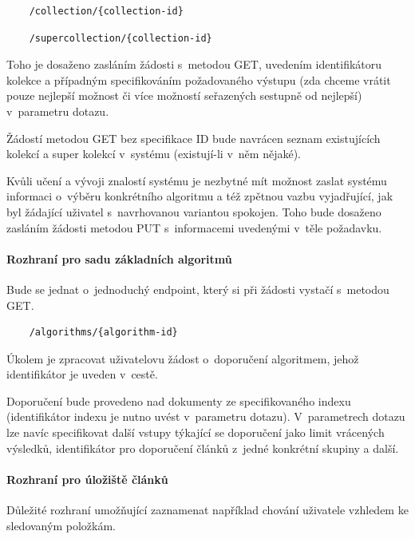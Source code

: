 \documentclass[thesis=M,czech]{FITthesis}[2014/05/07]
\begin{document}
\begin{verbatim}
	/collection/{collection-id}
\end{verbatim}

\begin{verbatim}
	/supercollection/{collection-id}
\end{verbatim}

Toho je dosaženo zasláním žádosti s~metodou GET, uvedením identifikátoru kolekce a případným specifikováním požadovaného výstupu (zda chceme vrátit pouze nejlepší možnost či více možností seřazených sestupně od nejlepší) v~parametru dotazu.

Žádostí metodou GET bez specifikace ID bude navrácen seznam existujících kolekcí a super kolekcí v~systému (existují-li v~něm nějaké).

Kvůli učení a vývoji znalostí systému je nezbytné mít možnost zaslat systému informaci o~výběru konkrétního algoritmu a též zpětnou vazbu vyjadřující, jak byl žádající uživatel s~navrhovanou variantou spokojen. Toho bude dosaženo zasláním žádosti metodou PUT s~informacemi uvedenými v~těle požadavku.

\paragraph{Rozhraní pro sadu základních algoritmů}

Bude se jednat o~jednoduchý endpoint, který si při žádosti vystačí s~metodou GET.

\begin{verbatim}
	/algorithms/{algorithm-id}
\end{verbatim}

Úkolem je zpracovat uživatelovu žádost o~doporučení algoritmem, jehož identifikátor je uveden v~cestě. 

Doporučení bude provedeno nad dokumenty ze specifikovaného indexu (identifikátor indexu je nutno uvést v~parametru dotazu). V~parametrech dotazu lze navíc specifikovat další vstupy týkající se doporučení jako limit vrácených výsledků, identifikátor pro doporučení článků z~jedné konkrétní skupiny a další.

\paragraph{Rozhraní pro úložiště článků}

Důležité rozhraní umožňující zaznamenat například chování uživatele vzhledem ke sledovaným položkám.
\end{document}
